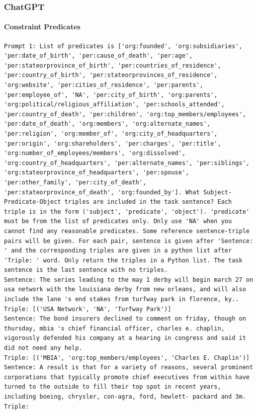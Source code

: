 \documentclass{article}
\begin{document}
\subsubsection{ChatGPT}
\paragraph{Constraint Predicates}
\begin{lstlisting}
Prompt 1: List of predicates is ['org:founded', 'org:subsidiaries', 'per:date_of_birth', 'per:cause_of_death', 'per:age', 'per:stateorprovince_of_birth', 'per:countries_of_residence', 'per:country_of_birth', 'per:stateorprovinces_of_residence', 'org:website', 'per:cities_of_residence', 'per:parents', 'per:employee_of', 'NA', 'per:city_of_birth', 'org:parents', 'org:political/religious_affiliation', 'per:schools_attended', 'per:country_of_death', 'per:children', 'org:top_members/employees', 'per:date_of_death', 'org:members', 'org:alternate_names', 'per:religion', 'org:member_of', 'org:city_of_headquarters', 'per:origin', 'org:shareholders', 'per:charges', 'per:title', 'org:number_of_employees/members', 'org:dissolved', 'org:country_of_headquarters', 'per:alternate_names', 'per:siblings', 'org:stateorprovince_of_headquarters', 'per:spouse', 'per:other_family', 'per:city_of_death', 'per:stateorprovince_of_death', 'org:founded_by']. What Subject-Predicate-Object triples are included in the task sentence? Each triple is in the form ('subject', 'predicate', 'object'). 'predicate' must be from the list of predicates only. Only use 'NA' when you cannot find any reasonable predicates. Some reference sentence-triple pairs will be given. For each pair, sentence is given after 'Sentence: ' and the corresponding triples are given in a python list after 'Triple: ' word. Only return the triples in a Python list. The task sentence is the last sentence with no triples.
Sentence: The series leading to the may 1 derby will begin march 27 on usa network with the louisiana derby from new orleans, and will also include the lane 's end stakes from turfway park in florence, ky.. 
Triple: [('USA Network', 'NA', 'Turfway Park')]
Sentence: The bond insurers declined to comment on friday, though on thursday, mbia 's chief financial officer, charles e. chaplin, vigorously defended his company at a hearing in congress and said it did not need any help. 
Triple: [('MBIA', 'org:top_members/employees', 'Charles E. Chaplin')]
Sentence: A result is that for a variety of reasons, several prominent corporations that typically promote chief executives from within have turned to the outside to fill their top spot in recent years, including boeing, chrysler, con-agra, ford, hewlett- packard and 3m. 
Triple:


\end{lstlisting}
\end{document}
